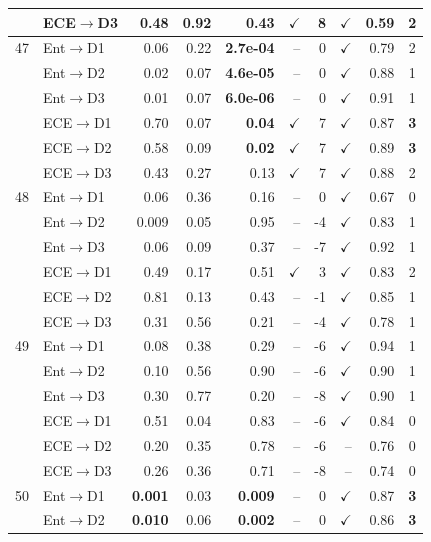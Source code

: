 \begin{table}[t]
\begin{tabular}{cl rrr rr rr c}
 & ECE$\to$D3 & 0.48 & 0.92 & 0.43 & $\checkmark$ & 8 & $\checkmark$ & 0.59 & 2 \\
\midrule
47 & Ent$\to$D1 & 0.06 & 0.22 & \textbf{2.7e-04} & -- & 0 & $\checkmark$ & 0.79 & 2 \\
 & Ent$\to$D2 & 0.02 & 0.07 & \textbf{4.6e-05} & -- & 0 & $\checkmark$ & 0.88 & 1 \\
 & Ent$\to$D3 & 0.01 & 0.07 & \textbf{6.0e-06} & -- & 0 & $\checkmark$ & 0.91 & 1 \\
\rowcolor{gray!15}  & ECE$\to$D1 & 0.70 & 0.07 & \textbf{0.04} & $\checkmark$ & 7 & $\checkmark$ & 0.87 & \textbf{3} \\
\rowcolor{gray!15}  & ECE$\to$D2 & 0.58 & 0.09 & \textbf{0.02} & $\checkmark$ & 7 & $\checkmark$ & 0.89 & \textbf{3} \\
 & ECE$\to$D3 & 0.43 & 0.27 & 0.13 & $\checkmark$ & 7 & $\checkmark$ & 0.88 & 2 \\
\midrule
48 & Ent$\to$D1 & 0.06 & 0.36 & 0.16 & -- & 0 & $\checkmark$ & 0.67 & 0 \\
 & Ent$\to$D2 & 0.009 & 0.05 & 0.95 & -- & -4 & $\checkmark$ & 0.83 & 1 \\
 & Ent$\to$D3 & 0.06 & 0.09 & 0.37 & -- & -7 & $\checkmark$ & 0.92 & 1 \\
 & ECE$\to$D1 & 0.49 & 0.17 & 0.51 & $\checkmark$ & 3 & $\checkmark$ & 0.83 & 2 \\
 & ECE$\to$D2 & 0.81 & 0.13 & 0.43 & -- & -1 & $\checkmark$ & 0.85 & 1 \\
 & ECE$\to$D3 & 0.31 & 0.56 & 0.21 & -- & -4 & $\checkmark$ & 0.78 & 1 \\
\midrule
49 & Ent$\to$D1 & 0.08 & 0.38 & 0.29 & -- & -6 & $\checkmark$ & 0.94 & 1 \\
 & Ent$\to$D2 & 0.10 & 0.56 & 0.90 & -- & -6 & $\checkmark$ & 0.90 & 1 \\
 & Ent$\to$D3 & 0.30 & 0.77 & 0.20 & -- & -8 & $\checkmark$ & 0.90 & 1 \\
 & ECE$\to$D1 & 0.51 & 0.04 & 0.83 & -- & -6 & $\checkmark$ & 0.84 & 0 \\
 & ECE$\to$D2 & 0.20 & 0.35 & 0.78 & -- & -6 & -- & 0.76 & 0 \\
 & ECE$\to$D3 & 0.26 & 0.36 & 0.71 & -- & -8 & -- & 0.74 & 0 \\
\midrule
\rowcolor{gray!15} 50 & Ent$\to$D1 & \textbf{0.001} & 0.03 & \textbf{0.009} & -- & 0 & $\checkmark$ & 0.87 & \textbf{3} \\
\rowcolor{gray!15}  & Ent$\to$D2 & \textbf{0.010} & 0.06 & \textbf{0.002} & -- & 0 & $\checkmark$ & 0.86 & \textbf{3} \\

\end{tabular}
\end{table}
